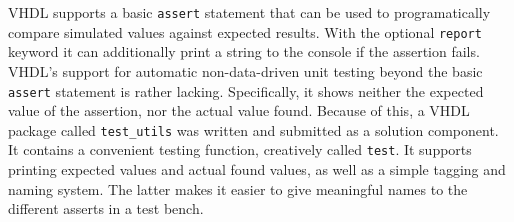 VHDL supports a basic \texttt{assert} statement that can be used to programatically compare simulated values against expected results. With the optional \texttt{report} keyword it can additionally print a string to the console if the assertion fails.
VHDL's support for automatic non-data-driven unit testing beyond the basic \texttt{assert} statement is rather lacking.
Specifically, it shows neither the expected value of the assertion, nor the actual value found.
Because of this, a VHDL package called \texttt{test\_utils} was written and submitted as a solution component.
It contains a convenient testing function, creatively called \texttt{test}.
It supports printing expected values and actual found values, as well as a simple tagging and naming system.
The latter makes it easier to give meaningful names to the different asserts in a test bench.
